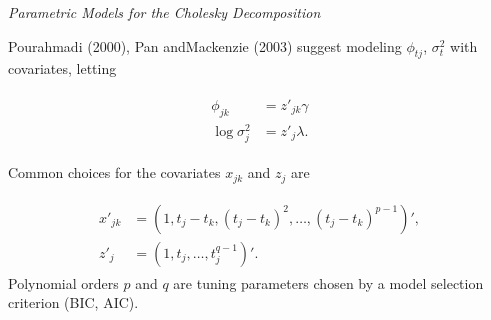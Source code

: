 \begin{frame}{\emph{Parametric Models for the Cholesky Decomposition}}{} \label{polynomial-mcd-model}

Pourahmadi (2000), Pan andMackenzie (2003) suggest modeling $\phi_{tj}$, $\sigma^2_{t}$ with covariates, letting 

\begin{align*}
\begin{split}  \label{eq:GARP-IV-parametric-model}
\phi_{jk} &= z'_{jk} \gamma \\
\log \sigma^2_{j} &= z'_{j}\lambda. 
\end{split}
\end{align*}

Common choices for the covariates $x_{jk}$ and $z_j$ are

\begin{align}
\begin{split} 
x'_{jk} &= \left(1, t_j - t_k, \left(t_j - t_k\right)^2,\dots, \left(t_j - t_k\right)^{p-1}\right)', \\
z'_{j}  &= \left(1, t_j, \dots, t_j^{q-1}\right)'.
\end{split}
\end{align} \label{eq:mcd-polynomial-model}
\noindent
Polynomial orders $p$ and $q$ are tuning parameters chosen by a model selection criterion (BIC, AIC).
\vspace{1cm}

\hyperlink{simulation-studies-benchmark-estimators}{}

\end{frame}


%


